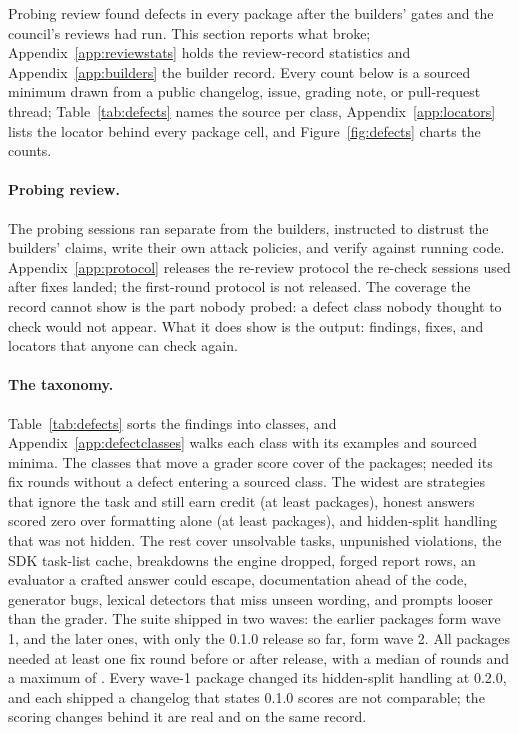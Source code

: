 Probing review found defects in every package after the builders' gates and the council's reviews had run. This section reports what broke; Appendix~\ref{app:reviewstats} holds the review-record statistics and Appendix~\ref{app:builders} the builder record. Every count below is a sourced minimum drawn from a public changelog, issue, grading note, or pull-request thread; Table~\ref{tab:defects} names the source per class, Appendix~\ref{app:locators} lists the locator behind every package cell, and Figure~\ref{fig:defects} charts the counts.

\paragraph{Probing review.}
The probing sessions ran separate from the builders, instructed to distrust the builders' claims, write their own attack policies, and verify against running code. Appendix~\ref{app:protocol} releases the re-review protocol the re-check sessions used after fixes landed; the first-round protocol is not released. The coverage the record cannot show is the part nobody probed: a defect class nobody thought to check would not appear. What it does show is the output: findings, fixes, and locators that anyone can check again.

\paragraph{The taxonomy.}
Table~\ref{tab:defects} sorts the findings into  classes, and Appendix~\ref{app:defectclasses} walks each class with its examples and sourced minima. The classes that move a grader score cover  of the \reviewPackages{} packages;  needed its fix rounds without a defect entering a sourced class. The widest are strategies that ignore the task and still earn credit (at least  packages), honest answers scored zero over formatting alone (at least  packages), and hidden-split handling that was not hidden. The rest cover unsolvable tasks, unpunished violations, the SDK task-list cache, breakdowns the engine dropped, forged report rows, an evaluator a crafted answer could escape, documentation ahead of the code, generator bugs, lexical detectors that miss unseen wording, and prompts looser than the grader. The suite shipped in two waves: the \reviewWaveOne{} earlier packages form wave 1, and the \expWaveTwo{} later ones, with only the 0.1.0 release so far, form wave 2. All \reviewPackages{} packages needed at least one fix round before or after release, with a median of \reviewRoundsMedian{} rounds and a maximum of \reviewRoundsMax{}. Every wave-1 package changed its hidden-split handling at 0.2.0, and each shipped a changelog that states 0.1.0 scores are not comparable; the scoring changes behind it are real and on the same record.

